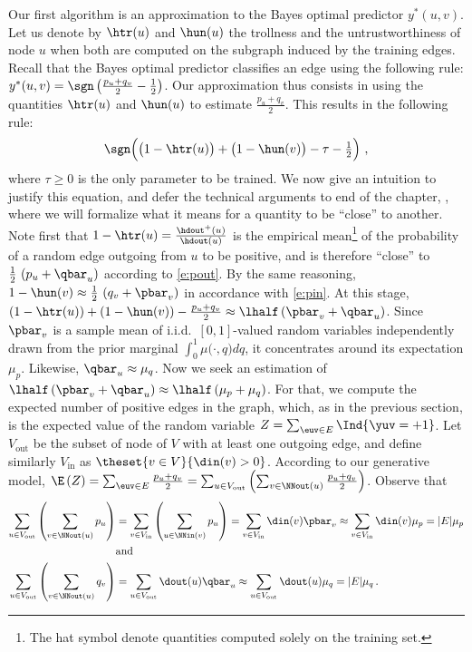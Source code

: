 Our first algorithm is an approximation to the Bayes optimal predictor $y^*(u,v)$. Let us denote by
$\htr(u)$ and $\hun(u)$ the trollness and the untrustworthiness of node $u$ when both are computed
on the subgraph induced by the training edges.
Recall that the Bayes optimal predictor classifies an edge \euv{} using the following rule:
$y^*(u,v) = \sgn\left( \frac{p_u+q_v}{2} - \frac{1}{2} \right)$. Our approximation thus consists in
using the quantities $\htr(u)$ and $\hun(u)$ to estimate $\frac{p_u+q_v}{2}$. This results in the
following rule:
\begin{equation}
  \label{eq:predictor}
  \sgn\Big(\big(1-\htr(u)\big) + \big(1-\hun(v)\big) - \tau - \tfrac{1}{2}\Big)~,
\end{equation}
where $\tau \ge 0$ is the only parameter to be trained. We now give an intuition to justify this
equation, and defer the technical arguments to end of the chapter,
, where we will formalize what it means for a quantity to be
\enquote{close} to another. Note first that $1-\htr(u) = \frac{\hdout^+(u)}{\hdout(u)}$ is the
empirical mean\footnote{The hat symbol denote quantities computed solely on the training set.} of
the probability of a random edge outgoing from $u$ to be positive, and is therefore \enquote{close}
to $\frac{1}{2}\,\left(p_u + \qbar_u\right)$ according to \eqref{e:pout}. By the same reasoning,
$1-\hun(v) \approx \frac{1}{2}\,\left(q_v + \pbar_v\right)$ in accordance with \eqref{e:pin}. At
this stage, $\left( 1 - \htr(u) \right) + \left( 1 - \hun(v) \right) - \frac{p_u+q_v}{2} \approx
\lhalf \left( \pbar_v + \qbar_u \right)$. Since $\pbar_v$ is a sample mean of i.i.d.~$[0,1]$-valued
random variables independently drawn from the prior marginal $\int_0^1 \mu\big(\cdot, q\big) dq$, it
concentrates around its expectation $\mu_p$. Likewise, $\qbar_u \approx \mu_q$. Now we seek an
estimation of $ \lhalf \left( \pbar_v + \qbar_u \right) \approx \lhalf \left( \mu_p + \mu_q
\right)$. For that, we compute the expected number of positive edges in the graph, which, as in the
previous section, is the expected value of the random variable $Z = \sum_{\euv \in E} \Ind{\yuv =
+1}$. Let $V_{\mathrm{out}}$ be the subset of node of $V$ with at least one outgoing edge, and
define similarly $V_{\mathrm{in}}$ as $\theset{v\in V}{\din(v) > 0}$. According to our generative
model, $\E\left(Z \right) = \sum_{\euv \in E} \frac{p_u+q_v}{2} = \sum_{u \in V_{\mathrm{out}}}
\left( \sum_{v \in \NNout(u)} \frac{p_u+q_v}{2} \right)$. Observe that
\begin{align*}
  \sum_{u \in V_{\mathrm{out}}} \left( \sum_{v \in \NNout(u)} p_u \right) &=
  \sum_{v \in V_{\mathrm{in}}} \left( \sum_{u \in \NNin(v)} p_u \right) =
  \sum_{v \in V_{\mathrm{in}}} \din(v) \pbar_v \approx
  \sum_{v \in V_{\mathrm{in}}} \din(v) \mu_p = |E| \mu_p \label{eq:troll_mup} \\
	&\text{and} \\ \sum_{u \in V_{\mathrm{out}}} \left( \sum_{v \in \NNout(u)} q_v \right) &=
  \sum_{u \in V_{\mathrm{out}}} \dout(u) \qbar_u \approx
  \sum_{u \in V_{\mathrm{out}}} \dout(u) \mu_q = |E| \mu_q \,.%
\end{align*}
